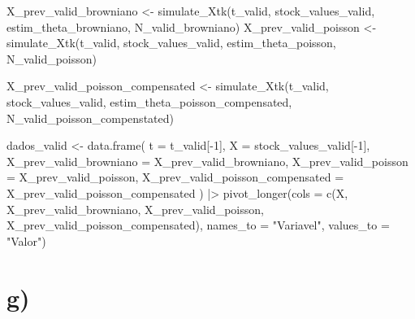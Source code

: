 \documentclass[
  letterpaper,
  DIV=11,
  numbers=noendperiod]{scrreprt}
\newenvironment{Shaded}{\begin{snugshade}}{\end{snugshade}}
\newcommand{\AttributeTok}[1]{\textcolor[rgb]{0.40,0.45,0.13}{#1}}
\newcommand{\DecValTok}[1]{\textcolor[rgb]{0.68,0.00,0.00}{#1}}
\newcommand{\FunctionTok}[1]{\textcolor[rgb]{0.28,0.35,0.67}{#1}}
\newcommand{\NormalTok}[1]{\textcolor[rgb]{0.00,0.23,0.31}{#1}}
\newcommand{\OtherTok}[1]{\textcolor[rgb]{0.00,0.23,0.31}{#1}}
\newcommand{\SpecialCharTok}[1]{\textcolor[rgb]{0.37,0.37,0.37}{#1}}
\newcommand{\StringTok}[1]{\textcolor[rgb]{0.13,0.47,0.30}{#1}}
\begin{document}
\begin{Shaded}
\begin{Highlighting}[]
\NormalTok{X\_prev\_valid\_browniano }\OtherTok{\textless{}{-}} \FunctionTok{simulate\_Xtk}\NormalTok{(t\_valid,}
\NormalTok{                                       stock\_values\_valid,}
\NormalTok{                                       estim\_theta\_browniano,}
\NormalTok{                                       N\_valid\_browniano)}
\NormalTok{X\_prev\_valid\_poisson }\OtherTok{\textless{}{-}} \FunctionTok{simulate\_Xtk}\NormalTok{(t\_valid,}
\NormalTok{                                     stock\_values\_valid,}
\NormalTok{                                     estim\_theta\_poisson,}
\NormalTok{                                     N\_valid\_poisson)}

\NormalTok{X\_prev\_valid\_poisson\_compensated }\OtherTok{\textless{}{-}} 
    \FunctionTok{simulate\_Xtk}\NormalTok{(t\_valid,}
\NormalTok{                 stock\_values\_valid,}
\NormalTok{                 estim\_theta\_poisson\_compensated,}
\NormalTok{                 N\_valid\_poisson\_compenstated)                                     }

\NormalTok{dados\_valid }\OtherTok{\textless{}{-}} \FunctionTok{data.frame}\NormalTok{(}
    \AttributeTok{t =}\NormalTok{ t\_valid[}\SpecialCharTok{{-}}\DecValTok{1}\NormalTok{],}
    \AttributeTok{X =}\NormalTok{ stock\_values\_valid[}\SpecialCharTok{{-}}\DecValTok{1}\NormalTok{],}
    \AttributeTok{X\_prev\_valid\_browniano =}\NormalTok{ X\_prev\_valid\_browniano,}
    \AttributeTok{X\_prev\_valid\_poisson =}\NormalTok{ X\_prev\_valid\_poisson,}
    \AttributeTok{X\_prev\_valid\_poisson\_compensated =}\NormalTok{ X\_prev\_valid\_poisson\_compensated}
\NormalTok{) }\SpecialCharTok{|\textgreater{}} 
\FunctionTok{pivot\_longer}\NormalTok{(}\AttributeTok{cols =} \FunctionTok{c}\NormalTok{(X,}
\NormalTok{                      X\_prev\_valid\_browniano,}
\NormalTok{                      X\_prev\_valid\_poisson,}
\NormalTok{                      X\_prev\_valid\_poisson\_compensated),}
             \AttributeTok{names\_to =} \StringTok{"Variavel"}\NormalTok{,}
             \AttributeTok{values\_to =} \StringTok{"Valor"}\NormalTok{) }
\end{Highlighting}
\end{Shaded}

\hypertarget{g}{%
\section*{g)}\label{g}}
\end{document}
